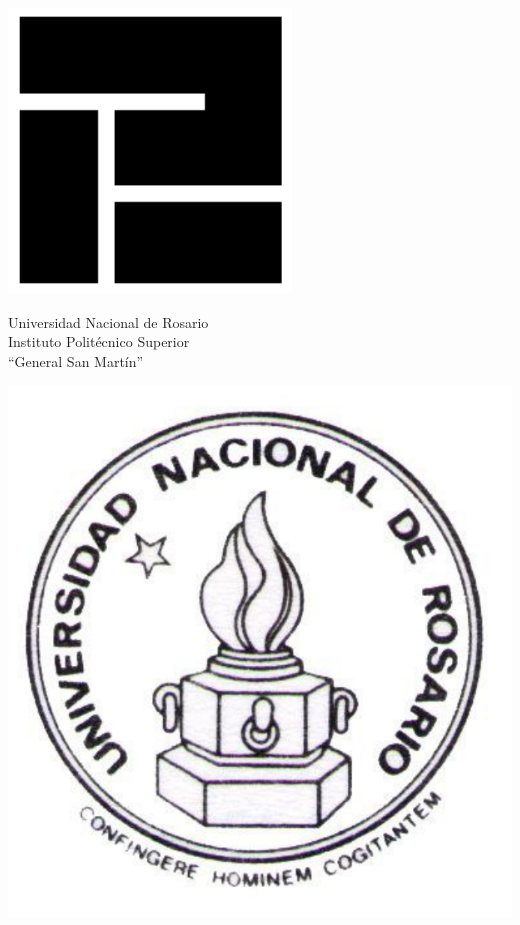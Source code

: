 \documentclass[a4paper, 12pt, usenames]{article}
\begin{document}
\begin{titlepage}
\begin{minipage}{2.6cm}
\includegraphics[width=\textwidth]{ips.pdf}
\end{minipage}
\begin{minipage}{11cm}
\begin{center}
\normalsize{Universidad Nacional de Rosario\\
Instituto Politécnico Superior\\
``General San Martín''\\}
\end{center}
\end{minipage}
\begin{minipage}{2.6cm}
\includegraphics[width=\textwidth]{unr.pdf}

\end{minipage}
\end{titlepage}
\end{document}
